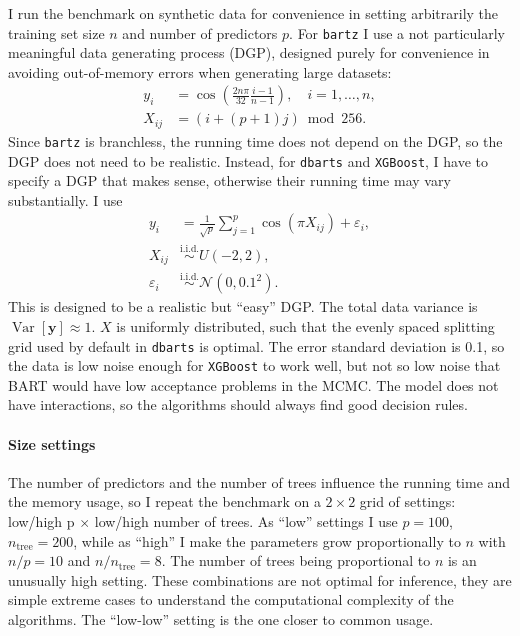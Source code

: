 \documentclass{article}
\let\oldmarginpar\marginpar
\renewcommand{\marginpar}[1]{\oldmarginpar{\sffamily\scriptsize #1}}
\renewcommand{\marginpar}[1]{\relax} %
\begin{document}
    I run the benchmark on synthetic data for convenience in setting arbitrarily the training set size $n$ and number of predictors $p$. For \texttt{bartz} I use a not particularly meaningful data generating process (DGP), designed purely for convenience in avoiding out-of-memory errors when generating large datasets:
    \begin{align}
        y_i &= \cos\left( \frac{2n\pi}{32} \frac{i-1}{n-1} \right), \quad i = 1,\ldots, n, \\
        X_{ij} &= (i + (p+1)j) \bmod 256.
    \end{align}
    Since \texttt{bartz} is branchless, the running time does not depend on the DGP, so the DGP does not need to be realistic. Instead, for \texttt{dbarts} and \texttt{XGBoost}, I have to specify a DGP that makes sense, otherwise their running time may vary substantially. I use
    \begin{align}
        y_i &= \frac1{\sqrt p}\sum_{j=1}^p \cos(\pi X_{ij}) + \varepsilon_i, \\
        X_{ij} &\overset{\mathrm{i.i.d.}}{\sim} U(-2, 2), \\
        \varepsilon_i &\overset{\mathrm{i.i.d.}}{\sim} \mathcal N(0, 0.1^2).
    \end{align}
    This is designed to be a realistic but ``easy'' DGP. The total data variance is $\operatorname{Var}[\mathbf y]\approx 1$. $X$ is uniformly distributed, such that the evenly spaced splitting grid used by default in \texttt{dbarts} is optimal. The error standard deviation is 0.1, so the data is low noise enough for \texttt{XGBoost} to work well, but not so low noise that BART would have low acceptance problems in the MCMC. The model does not have interactions, so the algorithms should always find good decision rules.

    \paragraph{Size settings}

    The number of predictors and the number of trees influence the running time and the memory usage, so I repeat the benchmark on a $2\times 2$ grid of settings: low/high p $\times$ low/high number of trees. As ``low'' settings I use $p=100$, $n_\text{tree} = 200$, while as ``high'' I make the parameters grow proportionally to $n$ with $n/p = 10$ and $n/n_\text{tree}=8$. The number of trees being proportional to $n$ is an unusually high setting.\marginpar{This number of trees probably is too crazy high for XGBoost. I don't know how to set it sensibly. It shouldn't stay constant either.} These combinations are not optimal for inference, they are simple extreme cases to understand the computational complexity of the algorithms. The ``low-low'' setting is the one closer to common usage.
\end{document}
